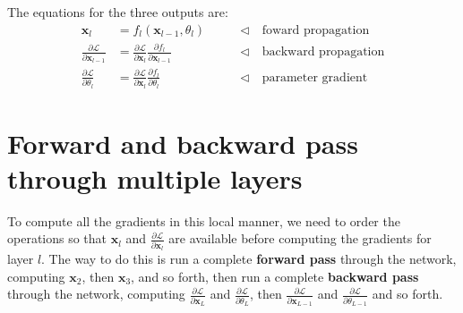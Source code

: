 The equations for the three outputs are:
\begin{align}
    \mathbf{x}_{l} &= f_l(\mathbf{x}_{l-1}, \theta_l) & \quad\quad \triangleleft \quad \text{foward propagation}\\
    \frac{\partial \mathcal{L}}{\partial \mathbf{x}_{l-1}} &= \frac{\partial \mathcal{L}}{\partial \mathbf{x}_{l}} \frac{\partial f_l}{\partial \mathbf{x}_{l-1}} & \quad\quad \triangleleft \quad \text{backward propagation} \label{update_x}\\
    \frac{\partial \mathcal{L}}{\partial \theta_l} &= \frac{\partial \mathcal{L}}{\partial \mathbf{x}_{l}} \frac{\partial f_l}{\partial \theta_l} & \quad\quad \triangleleft \quad \text{parameter gradient} \label{update_theta}
\end{align}

\section{Forward and backward pass through multiple layers}
To compute all the gradients in this local manner, we need to order the operations so that $\mathbf{x}_l$ and $\frac{\partial \mathcal{L}}{\partial \mathbf{x}_{l}}$ are available before computing the gradients for layer $l$. The way to do this is run a complete {\bf forward pass} through the network, computing $\mathbf{x}_2$, then $\mathbf{x}_3$, and so forth, then run a complete {\bf backward pass} through the network, computing $\frac{\partial \mathcal{L}}{\partial \mathbf{x}_{L}}$ and $\frac{\partial \mathcal{L}}{\partial \theta_{L}}$, then $\frac{\partial \mathcal{L}}{\partial \mathbf{x}_{L-1}}$ and $\frac{\partial \mathcal{L}}{\partial \theta_{L-1}}$ and so forth. 

